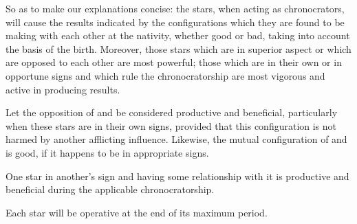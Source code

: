 So \mndl as to make our explanations concise: the stars, when acting as chronocrators, will cause the results indicated by the configurations which they are found to be making with each other at the nativity, whether good or bad, taking into account the basis of the birth. Moreover, those stars which are in superior aspect or which are opposed to each other are most powerful; those which are in their own or in opportune signs and which rule the chronocratorship are most vigorous and active in producing results. 

Let the opposition of \Saturn\xspace and \Jupiter\xspace be considered productive and beneficial, particularly when these stars are in their own
signs, provided that this configuration is not harmed by another afflicting influence. Likewise, the mutual configuration of \Jupiter\xspace and \Mars\xspace is good, if it happens to be in appropriate signs. 

One star in another’s sign and having some relationship with it is productive and beneficial during the applicable chronocratorship. 

Each star will be operative at the end of its maximum period.

\newpage